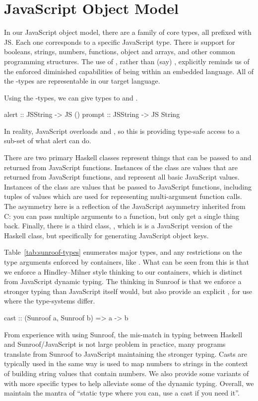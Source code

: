  
\section{JavaScript Object Model}
\label{sec:object-model}

In our JavaScript object model, there are a family of core types, all prefixed with JS.
Each one corresponds to a specific JavaScript type.
There is support for booleans, strings, numbers, functions,
object and arrays, and other common programming structures.
The use of , rather than (say) ,
explicitly reminds us of the enforced diminished capabilities of
being within an embedded language.
All of the -types are representable in our target language.

Using the -types, we can give types to  and .
\begin{Code}
alert :: JSString -> JS ()
prompt :: JSString -> JS String
\end{Code}
In reality, JavaScript overloads  and ,
so this is providing type-safe access to a sub-set of what
alert can do.

There are two primary Haskell classes represent things that can
be passed to and returned from JavaScript functions.
Instances of the  class 
are values that are returned from JavaScript functions,
and represent all basic JavaScript values.
Instances of the  class
are values that be passed to JavaScript functions,
including tuples of values which are used for representing multi-argument 
function calls.
The asymmetry here is a reflection of the JavaScript
asymmetry inherited from C: you can pass multiple arguments
to a function, but only get a single thing back.
Finally, there is a third class, , which is
is a JavaScript version of the Haskell  class,
but specifically for generating JavaScript object keys.

Table~\ref{tab:sunroof-types} enumerates major  types,
and any restrictions on the type arguments enforced by containers,
like . What can be seen from this is that we
enforce a Hindley–Milner style thinking to our containers,
which is distinct from JavaScript dynamic typing.
The thinking in Sunroof is that we enforce a stronger typing
than JavaScript itself would, but also provide an explicit ,
for use where the type-systems differ.
\begin{Code}
cast :: (Sunroof a, Sunroof b) => a -> b
\end{Code}
From experience with using Sunroof,
the mis-match in typing between Haskell and Sunroof/JavaScript
is not large problem in practice,
many programs translate from Sunroof to JavaScript
maintaining the stronger typing.
Casts are typically used in the same way  is used
to map numbers to strings in the context of building
string values that contain numbers. We also provide
some variants of  with more specific types
to help alleviate some of the dynamic typing.
Overall, we maintain the mantra of ``static type where you can,
use a cast if you need it''.


